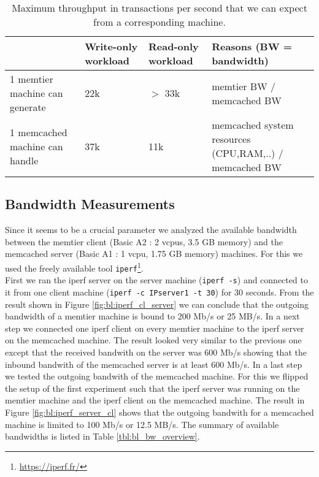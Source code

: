 \documentclass[11pt,a4paper]{article}
\let\tt\texttt
\begin{document}
\begin{table}
    \centering
    \begin{tabular}{|p{4cm}|p{2cm}|p{2cm}||p{6cm}|}
		\hline                        & Write-only workload & Read-only workload  & Reasons (BW = bandwidth)  \\ 
		\hline 1 memtier machine can generate   &        22k       &            $>$ 33k & memtier BW / memcached BW        \\ 
		\hline 1 memcached machine can handle &        37k            &         11k        & memcached system resources (CPU,RAM,..) / memcached BW     \\ 
		\hline 
	\end{tabular}
    \caption{Maximum throughput in transactions per second that we can expect from a corresponding machine.}

\end{table}
	


\subsection{Bandwidth Measurements}\label{sub:bw_measurements}
Since it seems to be a crucial parameter we analyzed the available bandwidth between the memtier client (Basic A2 : 2 vcpus, 3.5 GB memory) and the memcached server (Basic A1 : 1 vcpu, 1.75 GB memory) machines. For this we used the freely available tool \tt{iperf}\footnote{\url{https://iperf.fr/}}. \\
First we ran the iperf server on the server machine (\tt{iperf -s}) and connected to it from one client machine (\tt{iperf -c IPserver1 -t 30}) for 30 seconds. From the result shown in Figure \ref{fig:bl:iperf_cl_server} we can conclude that the outgoing bandwidth of a memtier machine is bound to 200 Mb/s or 25 MB/s.
In a next step we connected one iperf client on every memtier machine to the iperf server on the memcached machine. The result looked very similar to the previous one except that the received bandwith on the server was 600 Mb/s showing that the inbound bandwith of the memcached server is at least 600 Mb/s.
In a last step we tested the outgoing bandwith of the memcached machine. For this we flipped the setup of the first experiment such that the iperf server was running on the memtier machine and the iperf client on the memcached machine. The result in Figure \ref{fig:bl:iperf_server_cl} shows that the outgoing bandwith for a memcached machine is limited to 100 Mb/s or 12.5 MB/s. The summary of available bandwidths is listed in Table \ref{tbl:bl_bw_overview}.\\
\end{document}
